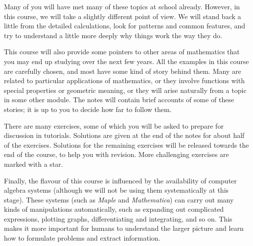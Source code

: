 \documentclass[a4paper]{book}
\theoremstyle{definition}
\begin{document}
Many of you will have met many of these topics at school already.
However, in this course, we will take a slightly different point of
view.  We will stand back a little from the detailed calculations,
look for patterns and common features, and try to understand a little
more deeply why things work the way they do.

This course will also provide some pointers to other areas of
mathematics that you may end up studying over the next few years.  All
the examples in this course are carefully chosen, and most have some
kind of story behind them.  Many are related to particular
applications of mathematics, or they involve functions with special
properties or geometric meaning, or they will arise naturally from a
topic in some other module.  The notes will contain brief accounts of
some of these stories; it is up to you to decide how far to follow
them.  

There are many exercises, some of which you will be asked to prepare
for discussion in tutorials.  Solutions are given at the end of the
notes for about half of the exercises.  Solutions for the remaining
exercises will be released towards the end of the course, to help you
with revision.  More challenging exercises are marked with a star.

Finally, the flavour of this course is influenced by the availability
of computer algebra systems (although we will not be using them
systematically at this stage).  These systems (such as \emph{Maple}
and \emph{Mathematica}) can carry out many kinds of manipulations
automatically, such as expanding out complicated expressions, plotting
graphs, differentiating and integrating, and so on.  This makes it
more important for humans to understand the larger picture and learn
how to formulate problems and extract information.


\end{document}
